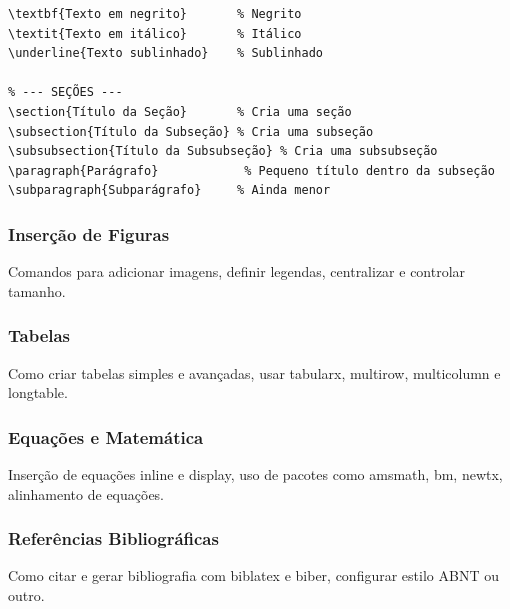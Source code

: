 \begin{lstlisting}[caption={Comandos básicos de texto e seções}]
% --- FORMATAÇÃO DE TEXTO ---
\textbf{Texto em negrito}       % Negrito
\textit{Texto em itálico}       % Itálico
\underline{Texto sublinhado}    % Sublinhado

% --- SEÇÕES ---
\section{Título da Seção}       % Cria uma seção
\subsection{Título da Subseção} % Cria uma subseção
\subsubsection{Título da Subsubseção} % Cria uma subsubseção
\paragraph{Parágrafo}            % Pequeno título dentro da subseção
\subparagraph{Subparágrafo}     % Ainda menor
\end{lstlisting}

\subsubsection{Inserção de Figuras}
Comandos para adicionar imagens, definir legendas, centralizar e controlar tamanho.

\subsubsection{Tabelas}
Como criar tabelas simples e avançadas, usar tabularx, multirow, multicolumn e longtable.

\subsubsection{Equações e Matemática}
Inserção de equações inline e display, uso de pacotes como amsmath, bm, newtx, alinhamento de equações.

\subsubsection{Referências Bibliográficas}
Como citar e gerar bibliografia com biblatex e biber, configurar estilo ABNT ou outro.

